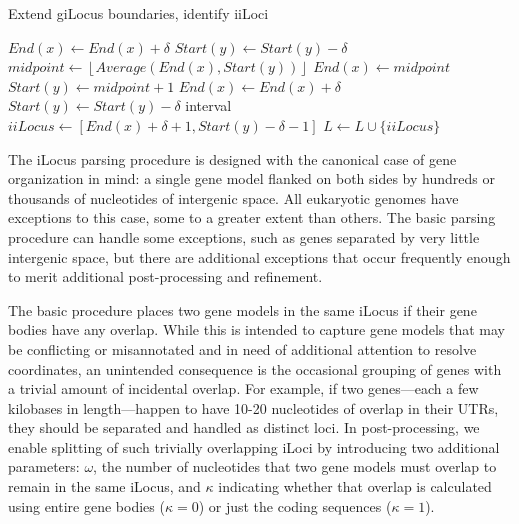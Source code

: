 \begin{algorithm}
\caption{Extend giLocus boundaries, identify iiLoci}
\label{Alg:ExtendIntervals}
\begin{algorithmic}[1]
    \State $\textit{End}(x) \gets \textit{End}(x) + \delta$
    \State $\textit{Start}(y) \gets \textit{Start}(y) - \delta$
    \State $\textit{midpoint} \gets \left\lfloor \textit{Average}\left(\textit{End}(x), \textit{Start}(y)\right) \right\rfloor$
    \State $\textit{End}(x) \gets \textit{midpoint}$
    \State $\textit{Start}(y) \gets \textit{midpoint} + 1$
\Else
    \State $\textit{End}(x) \gets \textit{End}(x) + \delta$
    \State $\textit{Start}(y) \gets \textit{Start}(y) - \delta$
    \State interval $iiLocus \gets [ \textit{End}(x)+\delta+1, \textit{Start}(y)-\delta-1 ]$
    \State $L \gets L \cup \{ iiLocus \}$
\EndIf
\EndFor
\EndProcedure
\end{algorithmic}
\end{algorithm}

The iLocus parsing procedure is designed with the canonical case of gene organization in mind: a single gene model flanked on both sides by hundreds or thousands of nucleotides of intergenic space.
All eukaryotic genomes have exceptions to this case, some to a greater extent than others.
The basic parsing procedure can handle some exceptions, such as genes separated by very little intergenic space, but there are additional exceptions that occur frequently enough to merit additional post-processing and refinement.

The basic procedure places two gene models in the same iLocus if their gene bodies have any overlap.
While this is intended to capture gene models that may be conflicting or misannotated and in need of additional attention to resolve coordinates, an unintended consequence is the occasional grouping of genes with a trivial amount of incidental overlap.
For example, if two genes---each a few kilobases in length---happen to have 10-20 nucleotides of overlap in their UTRs, they should be separated and handled as distinct loci.
In post-processing, we enable splitting of such trivially overlapping iLoci by introducing two additional parameters: $\omega$, the number of nucleotides that two gene models must overlap to remain in the same iLocus, and $\kappa$ indicating whether that overlap is calculated using entire gene bodies ($\kappa = 0$) or just the coding sequences ($\kappa = 1$).

